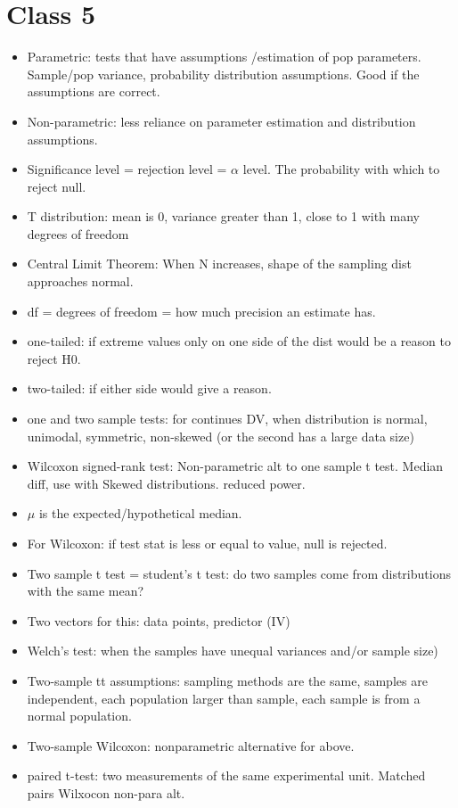 \documentclass[11pt]{article}
\newenvironment{itemise}{
\begin{itemize}
  \setlength{\itemsep}{1pt}
  \setlength{\parskip}{0pt}
  \setlength{\parsep}{0pt}
}{\end{itemize}}
\begin{document}
\section*{Class 5}
\begin{itemise}
\item Parametric: tests that have assumptions /estimation of pop parameters. Sample/pop variance, probability distribution assumptions. Good if the assumptions are correct.
\item Non-parametric: less reliance on parameter estimation and distribution assumptions. 
\item Significance level = rejection level = $\alpha$ level. The probability with which to reject null. 
\item T distribution: mean is 0, variance greater than 1, close to 1 with many degrees of freedom
\item Central Limit Theorem: When N increases, shape of the sampling dist approaches normal. %
\item df = degrees of freedom = how much precision an estimate has. 
\item one-tailed: if extreme values only on one side of the dist would be a reason to reject H0.
\item two-tailed: if either side would give a reason. 
\item  one and two sample tests: for continues DV, when distribution is normal, unimodal, symmetric, non-skewed (or the second has a large data size)
\item Wilcoxon signed-rank test: Non-parametric alt to one sample t test. Median diff, use with Skewed distributions. reduced power.
\item $\mu$ is the expected/hypothetical median.
\item For Wilcoxon: if test stat is less or equal to value, null is rejected. 
\item Two sample t test = student's t test: do two samples come from distributions with the same mean?
\item Two vectors for this: data points, predictor (IV)
\item Welch's test: when the samples have unequal variances and/or sample size)
\item Two-sample tt assumptions: sampling methods are the same, samples are independent, each population larger than sample, each sample is from a normal population.
\item Two-sample Wilcoxon: nonparametric alternative for above.
\item paired t-test: two measurements of the same experimental unit. Matched pairs Wilxocon non-para alt.
\end{itemise}
\end{document}
